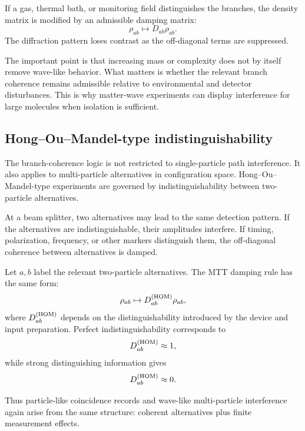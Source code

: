 \documentclass[11pt]{article}
\begin{document}
If a gas, thermal bath, or monitoring field distinguishes the branches, the density matrix is
modified by an admissible damping matrix:
\begin{equation}
  \rho_{ab}
  \mapsto
  D_{ab}\rho_{ab}.
\end{equation}
The diffraction pattern loses contrast as the off-diagonal terms are suppressed.

The important point is that increasing mass or complexity does not by itself remove
wave-like behavior. What matters is whether the relevant branch coherence remains admissible
relative to environmental and detector disturbances. This is why matter-wave experiments
can display interference for large molecules when isolation is sufficient.

\subsection{Hong--Ou--Mandel-type indistinguishability}
\label{subsec:hom}

The branch-coherence logic is not restricted to single-particle path interference. It also
applies to multi-particle alternatives in configuration space. Hong--Ou--Mandel-type
experiments are governed by indistinguishability between two-particle alternatives.

At a beam splitter, two alternatives may lead to the same detection pattern. If the alternatives
are indistinguishable, their amplitudes interfere. If timing, polarization, frequency, or other
markers distinguish them, the off-diagonal coherence between alternatives is damped.

Let \(a,b\) label the relevant two-particle alternatives. The MTT damping rule has the same
form:
\begin{equation}
  \rho_{ab}
  \mapsto
  D_{ab}^{(\rm HOM)}\rho_{ab},
\end{equation}
where \(D_{ab}^{(\rm HOM)}\) depends on the distinguishability introduced by the device and
input preparation. Perfect indistinguishability corresponds to
\begin{equation}
  D_{ab}^{(\rm HOM)}\approx1,
\end{equation}
while strong distinguishing information gives
\begin{equation}
  D_{ab}^{(\rm HOM)}\approx0.
\end{equation}

Thus particle-like coincidence records and wave-like multi-particle interference again arise
from the same structure: coherent alternatives plus finite measurement effects.
\end{document}
